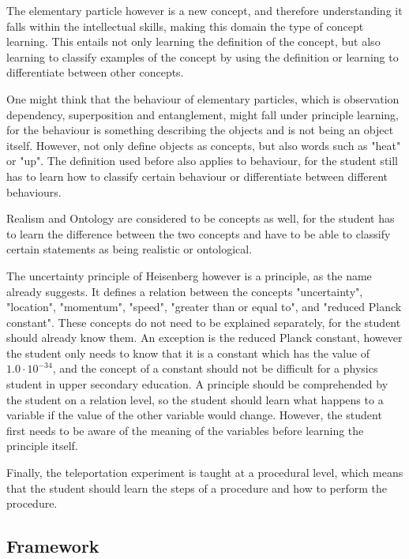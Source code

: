 \documentclass[11pt,twoside]{report} %
\begin{document}
The elementary particle however is a new concept, and therefore understanding it falls within the intellectual skills, making this domain the type of concept learning. This entails not only learning the definition of the concept, but also learning to classify examples of the concept by using the definition or learning to differentiate between other concepts.

One might think that the behaviour of elementary particles, which is observation dependency, superposition and entanglement, might fall under principle learning, for the behaviour is something describing the objects and is not being an object itself. However,  not only define objects as concepts, but also words such as "heat" or "up". The definition used before also applies to behaviour, for the student still has to learn how to classify certain behaviour or differentiate between different behaviours.

Realism and Ontology are considered to be concepts as well, for the student has to learn the difference between the two concepts and have to be able to classify certain statements as being realistic or ontological.

The uncertainty principle of Heisenberg however is a principle, as the name already suggests. It defines a relation between the concepts "uncertainty", "location", "momentum", "speed", "greater than or equal to", and "reduced Planck constant". These concepts do not need to be explained separately, for the student should already know them. An exception is the reduced Planck constant, however the student only needs to know that it is a constant which has the value of $1.0 \cdot 10^{-34}$, and the concept of a constant should not be difficult for a physics student in upper secondary education. A principle should be comprehended by the student on a relation level, so the student should learn what happens to a variable if the value of the other variable would change. However, the student first needs to be aware of the meaning of the variables before learning the principle itself.

Finally, the teleportation experiment is taught at a procedural level, which means that the student should learn the steps of a procedure and how to perform the procedure.

\subsection{Framework}
\end{document}
